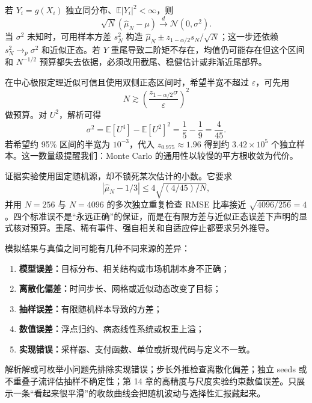 \begin{proposition}
若 $Y_i=g(X_i)$ 独立同分布、$\mathbb E|Y_i|^2<\infty$，则
\[
 \sqrt N(\hat\mu_N-\mu)\xrightarrow d\mathcal N(0,\sigma^2).
\]
当 $\sigma^2$ 未知时，可用样本方差 $s_N^2$ 构造
$\hat\mu_N\pm z_{1-\alpha/2}s_N/\sqrt N$；这一步还依赖 $s_N^2\to_p\sigma^2$ 和近似正态。若 $Y$ 重尾导致二阶矩不存在，均值仍可能存在但这个区间和 $N^{-1/2}$ 预算都失去依据，必须改用截尾、稳健估计或非渐近尾部界。
\end{proposition}




在中心极限定理近似可信且使用双侧正态区间时，希望半宽不超过 $\varepsilon$，可先用
\[
  N\gtrsim \left(\frac{z_{1-\alpha/2}\sigma}{\varepsilon}\right)^2
\]
做预算。对 $U^2$，解析可得
\[
  \sigma^2=\mathbb E[U^4]-\mathbb E[U^2]^2
  =\frac15-\frac19=\frac4{45}.
\]
若希望约 95\% 区间的半宽为 $10^{-3}$，代入 $z_{0.975}\approx1.96$ 得到约
$3.42\times10^5$ 个独立样本。这一数量级提醒我们：Monte Carlo 的通用性以较慢的平方根收敛为代价。


证据实验使用固定随机源，却不锁死某次估计的小数。它要求
\[
  |\hat\mu_N-1/3|\le 4\sqrt{(4/45)/N},
\]
并用 $N=256$ 与 $N=4096$ 的多次独立重复检查 RMSE 比率接近
$\sqrt{4096/256}=4$。四个标准误不是“永远正确”的保证，而是在有限方差与近似正态误差下声明的显式核对预算。重尾、稀有事件、强自相关和自适应停止都要求另外推导。


模拟结果与真值之间可能有几种不同来源的差异：
\begin{enumerate}[nosep,leftmargin=*]
  \item \textbf{模型误差：}目标分布、相关结构或市场机制本身不正确；
  \item \textbf{离散化偏差：}时间步长、网格或近似动态改变了目标；
  \item \textbf{抽样误差：}有限随机样本导致的方差；
  \item \textbf{数值误差：}浮点归约、病态线性系统或权重上溢；
  \item \textbf{实现错误：}采样器、支付函数、单位或折现代码与定义不一致。
\end{enumerate}
解析解或可枚举小问题先排除实现错误；步长外推检查离散化偏差；独立 seeds 或不重叠子流评估抽样不确定性；第 14 章的高精度与尺度实验约束数值误差。只展示一条“看起来很平滑”的收敛曲线会把随机波动与选择性汇报藏起来。

